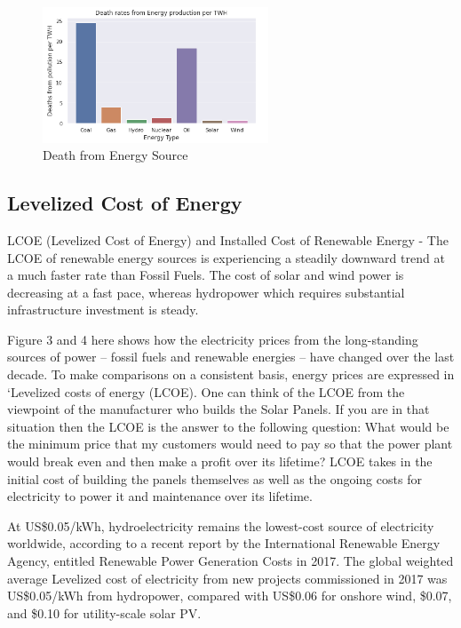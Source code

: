 \documentclass[10pt,twocolumn,letterpaper]{article}
\begin{document}
{\scriptsize
\begin{figure}[h!]
    \centering
    \includegraphics[width=0.6\textwidth]{figures/deaths_from_energy.PNG}
    \caption{Death from Energy Source}

\end{figure}
}



\subsection{Levelized Cost of Energy}

LCOE (Levelized Cost of Energy) and Installed Cost of Renewable Energy - The LCOE of renewable energy sources is experiencing a steadily downward trend at a much faster rate than Fossil Fuels. The cost of solar and wind power is decreasing at a fast pace, whereas hydropower which requires substantial infrastructure investment is steady. 


Figure 3 and 4 here shows how the electricity prices from the long-standing sources of power – fossil fuels and renewable energies – have changed over the last decade. To make comparisons on a consistent basis, energy prices are expressed in ‘Levelized costs of energy (LCOE). One can think of the LCOE from the viewpoint of the manufacturer who builds the Solar Panels. If you are in that situation then the LCOE is the answer to the following question: What would be the minimum price that my customers would need to pay so that the power plant would break even and then make a profit over its lifetime? LCOE takes in the initial cost of building the panels themselves as well as the ongoing costs for electricity to power it and maintenance over its lifetime. 

At US\$0.05/kWh, hydroelectricity remains the lowest-cost source of electricity worldwide, according to a recent report by the International Renewable Energy Agency, entitled Renewable Power Generation Costs in 2017. The global weighted average Levelized cost of electricity from new projects commissioned in 2017 was US\$0.05/kWh from hydropower, compared with US\$0.06 for onshore wind, \$0.07, and \$0.10 for utility-scale solar PV.
\end{document}
